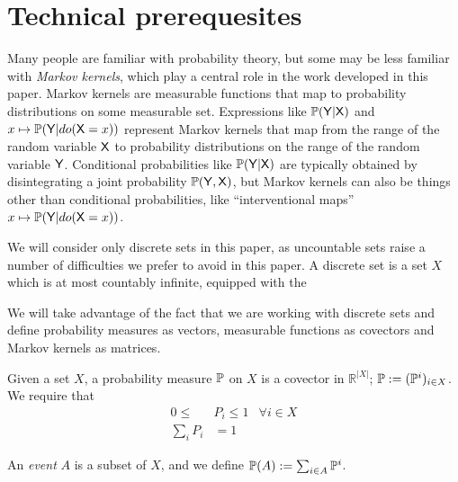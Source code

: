 

\section{Technical prerequesites}

Many people are familiar with probability theory, but some may be less familiar with \emph{Markov kernels}, which play a central role in the work developed in this paper. Markov kernels are measurable functions that map to probability distributions on some measurable set. Expressions like $\mathbb{P}(\mathsf{Y}|\mathsf{X})$ and $x\mapsto \mathbb{P}(\mathsf{Y}|do(\mathsf{X}=x))$ represent Markov kernels that map from the range of the random variable $\mathsf{X}$ to probability distributions on the range of the random variable $\mathsf{Y}$. Conditional probabilities like $\mathbb{P}(\mathsf{Y}|\mathsf{X})$ are typically obtained by disintegrating a joint probability $\mathbb{P}(\mathsf{Y},\mathsf{X})$, but Markov kernels can also be things other than conditional probabilities, like ``interventional maps'' $x\mapsto \mathbb{P}(\mathsf{Y}|do(\mathsf{X}=x))$.

We will consider only discrete sets in this paper, as uncountable sets raise a number of difficulties we prefer to avoid in this paper. A discrete set is a set $X$ which is at most countably infinite, equipped with the 


We will take advantage of the fact that we are working with discrete sets and define probability measures as vectors, measurable functions as covectors and Markov kernels as matrices.

Given a set $X$, a probability measure $\mathbb{P}$ on $X$ is a covector in $\mathbb{R}^{|X|}$; $\mathbb{P}:=(\mathbb{P}^i)_{i\in X}$. We require that
\begin{align}
	0\leq &P_i \leq 1 &\forall i\in X\\
	\sum_i P_i &= 1 
\end{align}

An \emph{event} $A$ is a subset of $X$, and we define $\mathbb{P}(A):=\sum_{i\in A} \mathbb{P}^i$.

